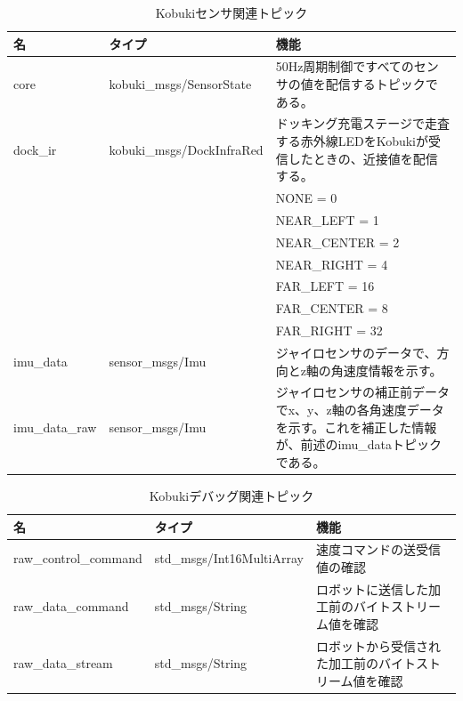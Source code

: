 \begin{itemize}
\begin{table}[htp]
\centering
\begin{tabular}{p{2cm} p{5cm} p{6cm}}
\toprule
\textbf{名} & \textbf{タイプ} & \textbf{機能}\\
\midrule
core  & kobuki\_msgs/SensorState  & 50Hz周期制御ですべてのセンサの値を配信するトピックである。 \\
dock\_ir  & kobuki\_msgs/DockInfraRed  & ドッキング充電ステージで走査する赤外線LEDをKobukiが受信したときの、近接値を配信する。\\
& & NONE = 0 \\
& & NEAR\_LEFT = 1 \\
& & NEAR\_CENTER = 2 \\
& & NEAR\_RIGHT = 4 \\
& & FAR\_LEFT = 16 \\
& & FAR\_CENTER = 8 \\
& & FAR\_RIGHT = 32 \\
imu\_data  & sensor\_msgs/Imu  & ジャイロセンサのデータで、方向とz軸の角速度情報を示す。\\
imu\_data\_raw & sensor\_msgs/Imu  & ジャイロセンサの補正前データでx、y、z軸の各角速度データを示す。これを補正した情報が、前述のimu\_dataトピックである。\\
\bottomrule
\end{tabular}
\caption{Kobukiセンサ関連トピック}
\end{table}

\begin{table}[htp]
\centering
\begin{tabular}{p{4cm} p{4cm} p{5cm}}
\toprule
\textbf{名} & \textbf{タイプ} & \textbf{機能}\\
\midrule
raw\_control\_command & std\_msgs/Int16MultiArray & 速度コマンドの送受信値の確認 \\
raw\_data\_command  & std\_msgs/String & ロボットに送信した加工前のバイトストリーム値を確認 \\
raw\_data\_stream & std\_msgs/String & ロボットから受信された加工前のバイトストリーム値を確認 \\
\bottomrule
\end{tabular}
\caption{Kobukiデバッグ関連トピック}
\end{table}


\end{itemize}

